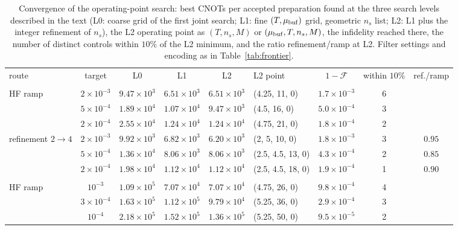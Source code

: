 \documentclass[aps,prc,reprint,superscriptaddress,floatfix,nofootinbib]{revtex4-2}
\begin{document}
\begin{table}[t]
\caption{\label{tab:converge}Convergence of the operating-point search:
best CNOTs per accepted preparation found at the three search levels
described in the text (L0: coarse grid of the first joint search; L1: fine
$(T,\mu_{\rm buf})$ grid, geometric $n_s$ list; L2: L1 plus the integer
refinement of $n_s$), the L2 operating point as $(T,n_s,M)$ or
$(\mu_{\rm buf},T,n_s,M)$, the infidelity reached there, the number of
distinct controls within $10\%$ of the L2 minimum, and the ratio
refinement/ramp at L2.  Filter settings and encoding as in
Table~\ref{tab:frontier}.}
\footnotesize
\begin{ruledtabular}
\begin{tabular}{lc ccc l c c c}
route & target & L0 & L1 & L2 & L2 point & $1-\mathcal F$ & within $10\%$ & ref./ramp\\
\colrule
\multicolumn{9}{l}{$k=4$, $N=4$, $g=1$}\\
HF ramp & $2\times10^{-3}$ & $9.47\times10^{3}$ & $6.51\times10^{3}$ & $6.51\times10^{3}$ & (4.25, 11, 0) & $1.7\times10^{-3}$ & 6 & \\
 & $5\times10^{-4}$ & $1.89\times10^{4}$ & $1.07\times10^{4}$ & $9.47\times10^{3}$ & (4.5, 16, 0) & $5.0\times10^{-4}$ & 3 & \\
 & $2\times10^{-4}$ & $2.55\times10^{4}$ & $1.24\times10^{4}$ & $1.24\times10^{4}$ & (4.75, 21, 0) & $1.8\times10^{-4}$ & 2 & \\
refinement $2\to4$ & $2\times10^{-3}$ & $9.92\times10^{3}$ & $6.82\times10^{3}$ & $6.20\times10^{3}$ & (2, 5, 10, 0) & $1.8\times10^{-3}$ & 3 & $0.95$\\
 & $5\times10^{-4}$ & $1.36\times10^{4}$ & $8.06\times10^{3}$ & $8.06\times10^{3}$ & (2.5, 4.5, 13, 0) & $4.3\times10^{-4}$ & 2 & $0.85$\\
 & $2\times10^{-4}$ & $1.98\times10^{4}$ & $1.12\times10^{4}$ & $1.12\times10^{4}$ & (2.5, 4.5, 18, 0) & $1.9\times10^{-4}$ & 1 & $0.90$\\
\colrule
\multicolumn{9}{l}{$k=8$, $N=8$, $g=1$}\\
HF ramp & $10^{-3}$ & $1.09\times10^{5}$ & $7.07\times10^{4}$ & $7.07\times10^{4}$ & (4.75, 26, 0) & $9.8\times10^{-4}$ & 4 & \\
 & $3\times10^{-4}$ & $1.63\times10^{5}$ & $1.12\times10^{5}$ & $9.79\times10^{4}$ & (5.25, 36, 0) & $2.9\times10^{-4}$ & 3 & \\
 & $10^{-4}$ & $2.18\times10^{5}$ & $1.52\times10^{5}$ & $1.36\times10^{5}$ & (5.25, 50, 0) & $9.5\times10^{-5}$ & 2 & \\

\end{tabular}
\end{ruledtabular}
\end{table}
\end{document}
